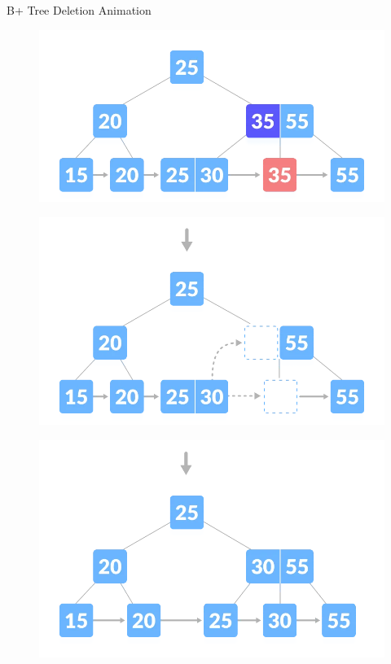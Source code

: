 \documentclass{beamer}
\begin{document}
\begin{frame}{B+ Tree Deletion Animation}
\begin{table}[h]
\begin{overprint}
\begin{figure}
        \end{figure}
        \begin{figure}
            \centering
            \includegraphics[scale=0.4]{Images/deletion-4.1.png}
        \end{figure}
        \begin{figure}
            \centering
             \includegraphics[scale=0.4]{Images/deletion-4.2.png}
        \end{figure}
        \begin{figure}
             \centering
             \includegraphics[scale=0.4]{Images/deletion-4.3.png}

\end{figure}
\end{overprint}
\end{table}
\end{frame}
\end{document}
